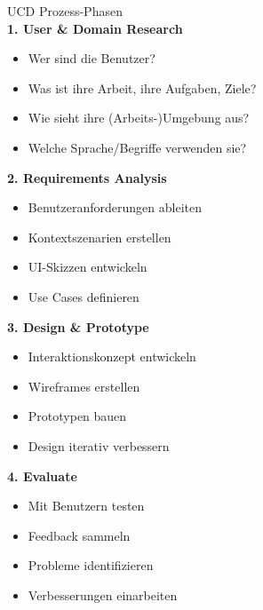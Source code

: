 \begin{theorem}{UCD Prozess-Phasen}\\
\textbf{1. User \& Domain Research}
\begin{itemize}
    \item Wer sind die Benutzer?
    \item Was ist ihre Arbeit, ihre Aufgaben, Ziele?
    \item Wie sieht ihre (Arbeits-)Umgebung aus?
    \item Welche Sprache/Begriffe verwenden sie?
\end{itemize}

\textbf{2. Requirements Analysis}
\begin{itemize}
    \item Benutzeranforderungen ableiten
    \item Kontextszenarien erstellen
    \item UI-Skizzen entwickeln
    \item Use Cases definieren
\end{itemize}

\textbf{3. Design \& Prototype}
\begin{itemize}
    \item Interaktionskonzept entwickeln
    \item Wireframes erstellen
    \item Prototypen bauen
    \item Design iterativ verbessern
\end{itemize}

\textbf{4. Evaluate}
\begin{itemize}
    \item Mit Benutzern testen
    \item Feedback sammeln
    \item Probleme identifizieren
    \item Verbesserungen einarbeiten
\end{itemize}
\end{theorem}

